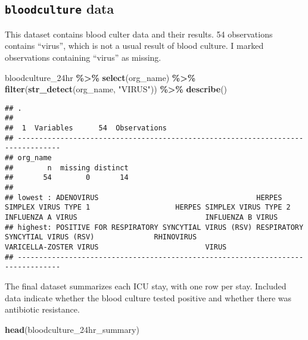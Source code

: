 \documentclass[
]{article}
\newenvironment{Shaded}{\begin{snugshade}}{\end{snugshade}}
\newcommand{\FunctionTok}[1]{\textcolor[rgb]{0.13,0.29,0.53}{\textbf{#1}}}
\newcommand{\NormalTok}[1]{#1}
\newcommand{\SpecialCharTok}[1]{\textcolor[rgb]{0.81,0.36,0.00}{\textbf{#1}}}
\newcommand{\StringTok}[1]{\textcolor[rgb]{0.31,0.60,0.02}{#1}}
\begin{document}
\hypertarget{bloodculture-data}{%
\subsection{\texorpdfstring{\texttt{bloodculture}
data}{bloodculture data}}\label{bloodculture-data}}

This dataset contains blood culter data and their results. 54
observations contains ``virus'', which is not a usual result of blood
culture. I marked observations containing ``virus'' as missing.

\begin{Shaded}
\begin{Highlighting}[]
\NormalTok{bloodculture\_24hr }\SpecialCharTok{\%\textgreater{}\%} 
  \FunctionTok{select}\NormalTok{(org\_name) }\SpecialCharTok{\%\textgreater{}\%}
  \FunctionTok{filter}\NormalTok{(}\FunctionTok{str\_detect}\NormalTok{(org\_name, }\StringTok{"VIRUS"}\NormalTok{)) }\SpecialCharTok{\%\textgreater{}\%}
  \FunctionTok{describe}\NormalTok{()}
\end{Highlighting}
\end{Shaded}

\begin{verbatim}
## . 
## 
##  1  Variables      54  Observations
## --------------------------------------------------------------------------------
## org_name 
##        n  missing distinct 
##       54        0       14 
## 
## lowest : ADENOVIRUS                                     HERPES SIMPLEX VIRUS TYPE 1                    HERPES SIMPLEX VIRUS TYPE 2                    INFLUENZA A VIRUS                              INFLUENZA B VIRUS                             
## highest: POSITIVE FOR RESPIRATORY SYNCYTIAL VIRUS (RSV) RESPIRATORY SYNCYTIAL VIRUS (RSV)              RHINOVIRUS                                     VARICELLA-ZOSTER VIRUS                         VIRUS                                         
## --------------------------------------------------------------------------------
\end{verbatim}

The final dataset summarizes each ICU stay, with one row per stay.
Included data indicate whether the blood culture tested positive and
whether there was antibiotic resistance.

\begin{Shaded}
\begin{Highlighting}[]
\FunctionTok{head}\NormalTok{(bloodculture\_24hr\_summary)}
\end{Highlighting}
\end{Shaded}
\end{document}
